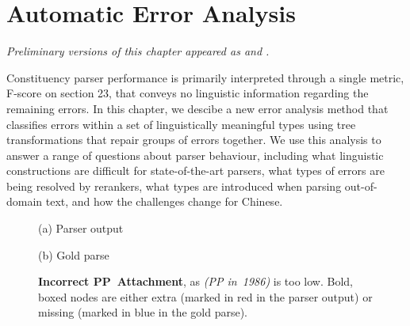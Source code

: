 \chapter{Automatic Error Analysis} \label{chp:analysis}

\begin{center}
\textit{
  Preliminary versions of this chapter appeared as \textcite{Kummerfeld-etal:2012:EMNLP} and \textcite{Kummerfeld-etal:2013:ACL}.
}
\end{center}

Constituency parser performance is primarily interpreted through a single metric, F-score on \wsj section 23, that conveys no linguistic information regarding the remaining errors.
In this chapter, we descibe a new error analysis method that classifies errors within a set of linguistically meaningful types using tree transformations that repair groups of errors together.
We use this analysis to answer a range of questions about parser behaviour, including what linguistic constructions are difficult for state-of-the-art parsers, what types of errors are being resolved by rerankers, what types are introduced when parsing out-of-domain text, and how the challenges change for Chinese.


\begin{figure}
\begin{center}

(a) Parser output
\vspace{3mm}


(b) Gold parse
\end{center}
\derivspace
\caption[Error analysis example: PP Attachment.]{ \label{fig:PP-attachment}
	\textbf{Incorrect PP~Attachment}, as \emph{(PP in~1986)} is too low.
	Bold, boxed nodes are either extra (marked in red in the parser output) or missing (marked in blue in the gold parse).
}
\derivaftercompress
\end{figure}

